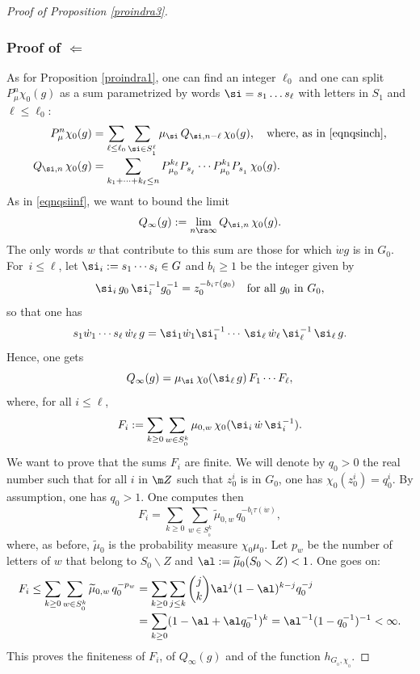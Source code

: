 \begin{proof}[Proof of Proposition \ref{proindra3}]
\subsubsection*{Proof of $\Leftarrow$}
As for Proposition \ref{proindra1},
one can find an integer $\ell_0$ and one can split $P^n_\mu\chi_0(g)$
as a sum parametrized by words $\si=s_1\ldots s_\ell$ with letters in $S_1$
and $\ell\leq \ell_0$:\vspace*{-3pt}
\begin{align*}
P^n_\mu\chi_0(g)
&=
\sum_{\ell\leq \ell_0}\sum_{\si\in S_{_1}^\ell}
\mu_\si\,Q_{\si,n-\ell}\,\chi_0(g),
\quad\text{where, as in \eqref{eqnqsinch},}\\[-3pt]
Q_{\si,n}\,\chi_0(g)
&=
\sum_{k_1+\cdots +k_\ell\leq n}
P^{k_\ell}_{\mu_{_0}}P_{s_{_\ell}}\cdots
P^{k_1}_{\mu_{_0}}P_{s_{_1}}\,\chi_0(g).
\end{align*}
As in \eqref{eqnqsiinf}, we want to bound the limit\vspace*{-3pt}
\[
Q_\infty(g)
:=
\lim_{n\ra\infty}
Q_{\si,n}\,\chi_0(g).
\]
The only words $w$ that contribute to this sum are those for which
$\dot{w}g$ is in $G_0$.
For~$i\leq \ell$, let $\si_i:=s_1\cdots s_i\in G$ and $b_i\geq 1$ be the integer given by\vspace*{-3pt}
\[
\si_i\,g_0\,\si_i^{-1}g_0^{-1}=z_0^{-b_i\tau(g_0)}
\quad\text{for all $g_0$ in $G_0$,}
\]
so that one has\vspace*{-3pt}
\begin{equation}
\label{eqnswswg2}
s_1\dot{w}_{1}\cdots s_\ell\, \dot{w}_{\ell}\, g
=
\si_1\dot{w}_{1}\si_1^{-1}\cdots\, \si_{\ell}\,\dot{w}_{\ell}\,\si_\ell^{-1}\,\si_\ell\, g.
\end{equation}
Hence, one gets\vspace*{-3pt}
\[
Q_\infty(g)
=\mu_\si\,\chi_0(\si_\ell\, g)\,F_1\cdots F_\ell,
\]
where, for all $i\leq \ell$,\vspace*{-3pt}
\[
F_i:=
\sum_{k\geq 0}
\sum_{w\in S^{k}_{_0}}
\mu_{0,w}\, \chi_0(\si_i\, \dot{w}\,\si^{-1}_i).
\]
We want to prove that the sums $F_i$ are finite.
We will denote by $q_0>0$ the real number such that
for all $i$ in $\m Z$ such that $z_0^i$ is in $G_0$, one has
$\chi_0(z_0^i)=q_0^i.$
By assumption, one has $q_0>1$. One computes then\vspace*{-3pt}
\[
F_i
=
\sum_{k\geq 0}
\sum_{w\in S^{k}_{_0}}
\widetilde{\mu}_{0,w}\, q_0^{-b_i\tau(\dot{w})},
\]
where, as before, $\widetilde{\mu}_0$ is the probability
measure $\chi_0\mu_0$.
Let $p_w$ be the number of letters of $w$ that belong to $S_0\smallsetminus Z$
and $\al:=\widetilde{\mu}_0(S_0\smallsetminus Z)<1$.
One goes on:\vspace*{-3pt}
\begin{align*}
F_i
\leq
\sum_{k\geq 0}
\sum_{w\in S^{k}_{_0}}
\widetilde{\mu}_{0,w}\, q_0^{-p_w}
&=\sum_{k\geq 0}
\sum_{j\leq k}
\binom{j}{k}\al^j(1-\al )^{k-j}q_0^{-j}\\[-3pt]
&=
\sum_{k\geq 0}
(1-\al+\al q_0^{-1})^k
= \al^{-1}(1-q_0^{-1})^{-1}< \infty.
\end{align*}
This proves the finiteness of $F_i$, of $Q_\infty(g)$ and of the function $h_{G_{_0},\chi_{_0}}$.
\end{proof}


